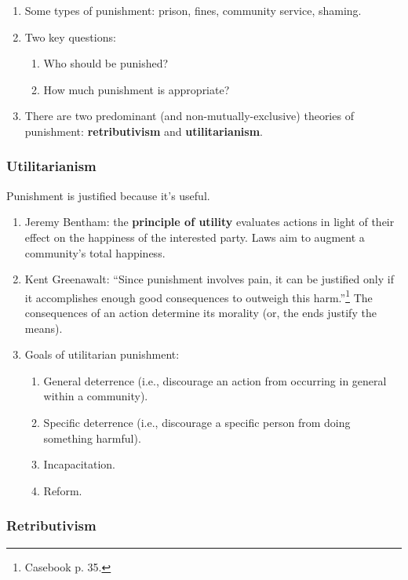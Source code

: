 \begin{enumerate}
    \item Some types of punishment: prison, fines, community service, shaming.
    \item Two key questions:
    \begin{enumerate}
        \item Who should be punished?
        \item How much punishment is appropriate?
    \end{enumerate}
    \item There are two predominant (and non-mutually-exclusive) theories of 
    punishment: \textbf{retributivism} and \textbf{utilitarianism}.
\end{enumerate}

\subsubsection{Utilitarianism}

Punishment is justified because it's useful.

\begin{enumerate}
    \item Jeremy Bentham: the \textbf{principle of utility} evaluates actions 
    in light of their effect on the happiness of the interested party. Laws 
    aim to augment a community's total happiness.
    \item Kent Greenawalt: ``Since punishment involves pain, it can be 
    justified only if it accomplishes enough good consequences to outweigh 
    this harm.''\footnote{Casebook p. 35.} The consequences of an action 
    determine its morality (or, the ends justify the means).
    \item Goals of utilitarian punishment:
    \begin{enumerate}
        \item General deterrence (i.e., discourage an action from occurring in 
        general within a community).
        \item Specific deterrence (i.e., discourage a specific person from 
        doing something harmful).
        \item Incapacitation.
        \item Reform.
    \end{enumerate}
\end{enumerate}

\subsubsection{Retributivism}

